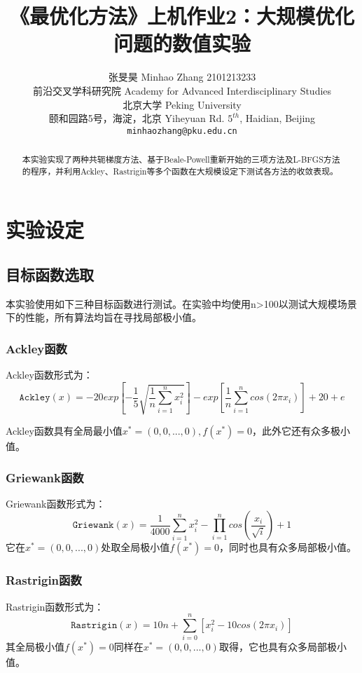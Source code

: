 \documentclass{article}
\title{《最优化方法》上机作业2：大规模优化问题的数值实验}
\author{%
  张旻昊 Minhao Zhang 2101213233 \\
  前沿交叉学科研究院 Academy for Advanced Interdisciplinary Studies\\
  北京大学 Peking University\\
  颐和园路5号，海淀，北京 Yiheyuan Rd. $5^{th}$, Haidian, Beijing\\
  \texttt{minhaozhang@pku.edu.cn} \\
}
\begin{document}

\maketitle

\begin{abstract}
  本实验实现了两种共轭梯度方法、基于Beale-Powell重新开始的三项方法及L-BFGS方法的程序，并利用Ackley、Rastrigin等多个函数在大规模设定下测试各方法的收敛表现。
  
\end{abstract}

\section{实验设定}
\subsection{目标函数选取}
本实验使用如下三种目标函数进行测试。在实验中均使用n>100以测试大规模场景下的性能，所有算法均旨在寻找局部极小值。

\subsubsection{Ackley函数}

Ackley函数形式为：
\[ \texttt{Ackley}(x) = -20 exp[-\frac{1}{5} \sqrt{\frac{1}{n}\sum\limits_{i=1}^n x_i^2}] - exp[\frac{1}{n} \sum\limits_{i=1}^n cos(2\pi x_i)] + 20+e \]

Ackley函数具有全局最小值$x^* = (0,0,...,0), f(x^*)=0$，此外它还有众多极小值。

\subsubsection{Griewank函数}
Griewank函数形式为：
\[ \texttt{Griewank}(x) = \frac{1}{4000}\sum\limits_{i=1}^n x_i^2 - \prod\limits_{i=1}^n cos(\frac{x_i}{\sqrt{i}}) + 1 \]
它在$x^* = (0,0,...,0)$处取全局极小值$f(x^*)=0$，同时也具有众多局部极小值。

\subsubsection{Rastrigin函数}
Rastrigin函数形式为：
\[ \texttt{Rastrigin}(x) = 10n + \sum\limits_{i=0}^n [x_i^2 - 10cos(2\pi x_i)] \]
其全局极小值$f(x^*)=0$同样在$x^* = (0,0,...,0)$取得，它也具有众多局部极小值。
\end{document}
